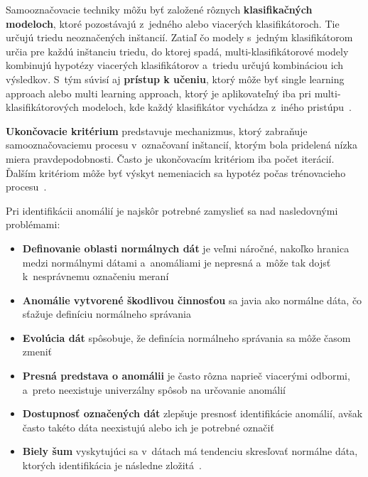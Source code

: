 \documentclass[a4paper,twoside,slovak,12pt]{article}
\begin{document}
Samooznačovacie techniky môžu byť založené rôznych
\textbf{klasifikačných modeloch}, ktoré pozostávajú z~jedného alebo viacerých
klasifikátoroch. Tie určujú triedu neoznačených inštancií. Zatiaľ čo modely
s~jedným klasifikátorom určia pre každú inštanciu triedu, do ktorej spadá,
multi-klasifikátorové modely kombinujú hypotézy viacerých klasifikátorov
a~triedu určujú kombináciou ich výsledkov. S~tým súvisí aj
\textbf{prístup k učeniu}, ktorý môže byť single learning approach alebo
multi learning approach, ktorý je aplikovateľný iba pri multi-klasifikátorových
modeloch, kde každý klasifikátor vychádza z~iného pristúpu~\cite{Gonzalez2017}.

\textbf{Ukončovacie kritérium} predstavuje mechanizmus, ktorý zabraňuje
samooznačovaciemu procesu v~označovaní inštancií, ktorým bola pridelená nízka
miera pravdepodobnosti. Často je ukončovacím kritériom iba počet iterácií.
Ďalším kritériom môže byť výskyt nemeniacich sa hypotéz počas trénovacieho
procesu~\cite{Gonzalez2017}.

Pri identifikácii anomálií je najskôr potrebné zamyslieť sa nad nasledovnými
problémami:

\begin{itemize}[noitemsep]
\item \textbf{Definovanie oblasti normálnych dát} je veľmi náročné, nakoľko
hranica medzi normálnymi dátami a~anomáliami je nepresná a~môže tak dojsť
k~nesprávnemu označeniu meraní
\item \textbf{Anomálie vytvorené škodlivou činnosťou} sa javia ako normálne
dáta, čo sťažuje definíciu normálneho správania
\item \textbf{Evolúcia dát} spôsobuje, že definícia normálneho správania sa môže
časom zmeniť
\item \textbf{Presná predstava o anomálii} je často rôzna naprieč viacerými
odbormi, a~preto neexistuje univerzálny spôsob na určovanie anomálií
\item \textbf{Dostupnosť označených dát} zlepšuje presnosť identifikácie anomálií,
avšak často takéto dáta neexistujú alebo ich je potrebné označiť
\item \textbf{Biely šum} vyskytujúci sa v~dátach má tendenciu skresľovať
normálne dáta, ktorých identifikácia je následne zložitá~\cite{Chandola2009}.
\end{itemize}

\end{document}
